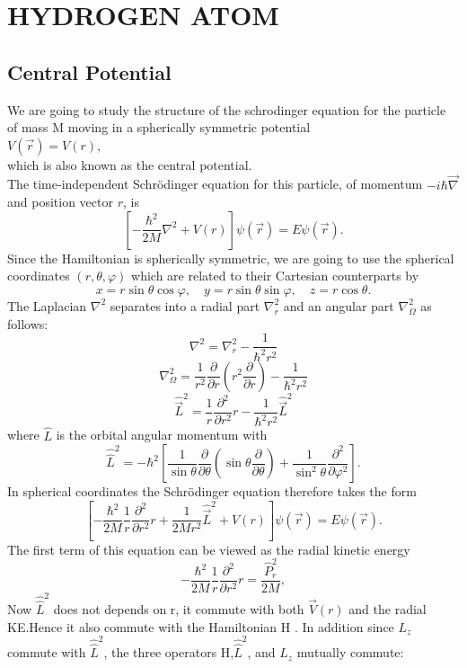 \chapter{HYDROGEN ATOM }
\section{Central Potential}
We are going to study the structure of the schrodinger equation for the particle of mass M moving in a spherically symmetric potential\\
 $V(\vec{r})=V(r)$,\\
which is also known as the central potential.\\
The time-independent Schrödinger equation for this particle, of momentum $-i \hbar \vec{\nabla}$ and position vector $r$, is
$$
\left[-\frac{\hbar^{2}}{2 M} \nabla^{2}+V(r)\right] \psi(\vec{r})=E \psi(\vec{r}) .
$$
Since the Hamiltonian is spherically symmetric, we are going to use the spherical coordinates $(r, \theta, \varphi)$ which are related to their Cartesian counterparts by
$$
x=r \sin \theta \cos \varphi, \quad y=r \sin \theta \sin \varphi, \quad z=r \cos \theta .
$$
The Laplacian $\nabla^{2}$ separates into a radial part $\nabla_{r}^{2}$ and an angular part $\nabla_{\Omega}^{2}$ as follows:
$$
\nabla^{2}=\nabla_{r}^{2}-\frac{1}{\hbar^{2} r^{2}}$$
 $$\nabla_{\Omega}^{2}=\frac{1}{r^{2}} \frac{\partial}{\partial r}\left(r^{2} \frac{\partial}{\partial r}\right)-\frac{1}{\hbar^{2} r^{2}}$$ $$\hat{\vec{L}}^{2}=\frac{1}{r} \frac{\partial^{2}}{\partial r^{2}} r-\frac{1}{\hbar^{2} r^{2}} \hat{\vec{L}}^{2}
$$
where $\hat{L}$ is the orbital angular momentum with
$$
\hat{\hat{L}}^{2}=-\hbar^{2}\left[\frac{1}{\sin \theta} \frac{\partial}{\partial \theta}\left(\sin \theta \frac{\partial}{\partial \theta}\right)+\frac{1}{\sin ^{2} \theta} \frac{\partial^{2}}{\partial \varphi^{2}}\right] .
$$
In spherical coordinates the Schrödinger equation therefore takes the form
$$
\left[-\frac{\hbar^{2}}{2 M} \frac{1}{r} \frac{\partial^{2}}{\partial r^{2}} r+\frac{1}{2 M r^{2}} \hat{\vec{L}}^{2}+V(r)\right] \psi(\vec{r})=E \psi(\vec{r}) .
$$
The first term of this equation can be viewed as the radial kinetic energy
$$
-\frac{\hbar^{2}}{2 M} \frac{1}{r} \frac{\partial^{2}}{\partial r^{2}} r=\frac{\hat{P}_{r}^{2}}{2 M},
$$
Now $\hat{\hat{L}}^{2}$ does not depends on r, it commute with both $\vec{V}(r)$ and the radial KE.Hence it also commute with the Hamiltonian H . In addition since $L_z$ commute with $\hat{\hat{L}}^{2}$, the three operators H,$\hat{\hat{L}}^{2}$, and $L_z$ mutually commute:
